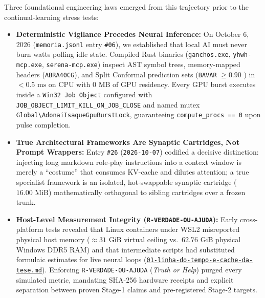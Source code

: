 \documentclass[10pt,a4paper]{article}
\begin{document}
Three foundational engineering laws emerged from this trajectory prior to the continual-learning stress tests:
\begin{itemize}
  \item \textbf{Deterministic Vigilance Precedes Neural Inference:} On October 6, 2026 (\texttt{memoria.jsonl} entry \texttt{\#06}), we established that local AI must never burn watts polling idle state. Compiled Rust binaries (\texttt{ganchos.exe}, \texttt{yhwh-mcp.exe}, \texttt{serena-mcp.exe}) inspect AST symbol trees, memory-mapped headers (\texttt{ABRA40CG}), and Split Conformal prediction sets (\texttt{BAVAR} $\ge 0.90$ \cite{angelopoulos2023conformal}) in $<0.5\text{ ms}$ on CPU with $0\text{ MB}$ of GPU residency. Every GPU burst executes inside a \texttt{Win32 Job Object} configured with \texttt{JOB\_\allowbreak{}OBJECT\_\allowbreak{}LIMIT\_\allowbreak{}KILL\_\allowbreak{}ON\_\allowbreak{}JOB\_\allowbreak{}CLOSE} and named mutex \texttt{Global\textbackslash AdonaiIsaqueGpuBurstLock}, guaranteeing \texttt{compute\_\allowbreak{}procs == 0} upon pulse completion.
  \item \textbf{True Architectural Frameworks Are Synaptic Cartridges, Not Prompt Wrappers:} Entry \texttt{\#26} (\texttt{2026-10-07}) codified a decisive distinction: injecting long markdown role-play instructions into a context window is merely a ``costume'' that consumes KV-cache and dilutes attention; a true specialist framework is an isolated, hot-swappable synaptic cartridge ($16.00\text{ MiB}$) mathematically orthogonal to sibling cartridges over a frozen trunk.
  \item \textbf{Host-Level Measurement Integrity (\texttt{R-VERDADE-OU-AJUDA}):} Early cross-platform tests revealed that Linux containers under WSL2 misreported physical host memory ($\approx 31\text{ GiB}$ virtual ceiling vs.\ $62.76\text{ GiB}$ physical Windows DDR5 RAM) and that intermediate scripts had substituted formulaic estimates for live neural loops (\href{https://drive.google.com/file/d/16-3o4ykaOOKaW-S2VTHzpE7Uhj1BA0tl/view?usp=drivesdk}{\texttt{01-linha-do-tempo-e-cache-da-tese.md}}). Enforcing \texttt{R-VERDADE-OU-AJUDA} (\textit{Truth or Help}) purged every simulated metric, mandating SHA-256 hardware receipts and explicit separation between proven Stage-1 claims and pre-registered Stage-2 targets.
\end{itemize}

\end{document}
